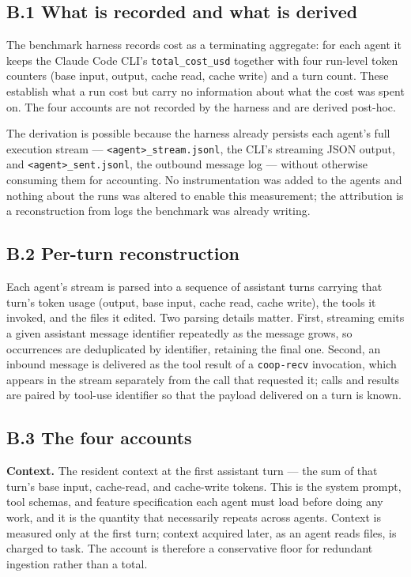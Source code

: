 \documentclass[11pt,a4paper]{article}
\begin{document}
\subsection*{B.1 \quad What is recorded and what is derived}

The benchmark harness records cost as a terminating aggregate: for each agent it
keeps the Claude Code CLI's \texttt{total\_cost\_usd} together with four run-level
token counters (base input, output, cache read, cache write) and a turn count.
These establish what a run cost but carry no information about what the cost was
spent on. The four accounts are not recorded by the harness and are derived
post-hoc.

The derivation is possible because the harness already persists each agent's full
execution stream --- \texttt{<agent>\_stream.jsonl}, the CLI's streaming JSON
output, and \texttt{<agent>\_sent.jsonl}, the outbound message log --- without
otherwise consuming them for accounting. No instrumentation was added to the
agents and nothing about the runs was altered to enable this measurement; the
attribution is a reconstruction from logs the benchmark was already writing.

\subsection*{B.2 \quad Per-turn reconstruction}

Each agent's stream is parsed into a sequence of assistant turns carrying that
turn's token usage (output, base input, cache read, cache write), the tools it
invoked, and the files it edited. Two parsing details matter. First, streaming
emits a given assistant message identifier repeatedly as the message grows, so
occurrences are deduplicated by identifier, retaining the final one. Second, an
inbound message is delivered as the tool result of a \texttt{coop-recv}
invocation, which appears in the stream separately from the call that requested
it; calls and results are paired by tool-use identifier so that the payload
delivered on a turn is known.

\subsection*{B.3 \quad The four accounts}

\textbf{Context.} The resident context at the first assistant turn --- the sum of
that turn's base input, cache-read, and cache-write tokens. This is the system
prompt, tool schemas, and feature specification each agent must load before doing
any work, and it is the quantity that necessarily repeats across agents. Context
is measured only at the first turn; context acquired later, as an agent reads
files, is charged to task. The account is therefore a conservative floor for
redundant ingestion rather than a total.
\end{document}
